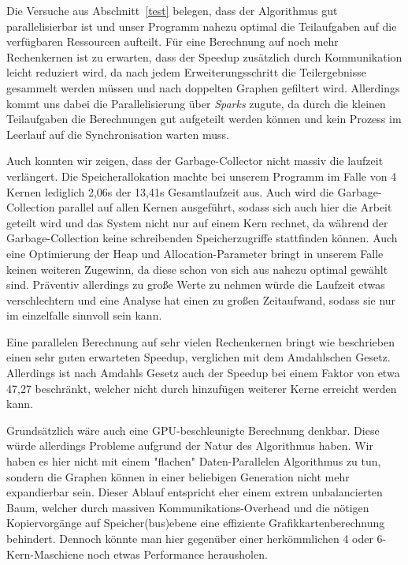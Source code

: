 \documentclass[a4paper]{scrartcl}
\begin{document}
Die Versuche aus Abschnitt~\ref{test} belegen, dass der Algorithmus gut parallelisierbar ist und unser Programm nahezu optimal die Teilaufgaben auf die verfügbaren Ressourcen aufteilt. Für eine Berechnung auf noch mehr Rechenkernen ist zu erwarten, dass der Speedup zusätzlich durch Kommunikation leicht reduziert wird, da nach jedem Erweiterungsschritt die Teilergebnisse gesammelt werden müssen und nach doppelten Graphen gefiltert wird. Allerdings kommt uns dabei die Parallelisierung über \emph{Sparks} zugute, da durch die kleinen Teilaufgaben die Berechnungen gut aufgeteilt werden können und kein Prozess im Leerlauf auf die Synchronisation warten muss. \par
\medskip
Auch konnten wir zeigen, dass der Garbage-Collector nicht massiv die laufzeit verlängert. Die Speicherallokation machte bei unserem Programm im Falle von 4 Kernen lediglich 2,06s der 13,41s Gesamtlaufzeit aus. Auch wird die Garbage-Collection parallel auf allen Kernen ausgeführt, sodass sich auch hier die Arbeit geteilt wird und das System nicht nur auf einem Kern rechnet, da während der Garbage-Collection keine schreibenden Speicherzugriffe stattfinden können.
Auch eine Optimierung der Heap und Allocation-Parameter bringt in unserem Falle keinen weiteren Zugewinn, da diese schon von sich aus nahezu optimal gewählt sind. Präventiv allerdings zu große Werte zu nehmen würde die Laufzeit etwas verschlechtern und eine Analyse hat einen zu großen Zeitaufwand, sodass sie nur im einzelfalle sinnvoll sein kann.\par
\medskip
Eine parallelen Berechnung auf sehr vielen Rechenkernen bringt wie beschrieben einen sehr guten erwarteten Speedup, verglichen mit dem Amdahlschen Gesetz. Allerdings ist nach Amdahls Gesetz auch der Speedup bei einem Faktor von etwa 47,27 beschränkt, welcher nicht durch hinzufügen weiterer Kerne erreicht werden kann.\par
Grundsätzlich wäre auch eine GPU-beschleunigte Berechnung denkbar. Diese würde allerdings Probleme aufgrund der Natur des Algorithmus haben. Wir haben es hier nicht mit einem "flachen" Daten-Parallelen Algorithmus zu tun, sondern die Graphen können in einer beliebigen Generation nicht mehr expandierbar sein. Dieser Ablauf entspricht eher einem extrem unbalancierten Baum, welcher durch massiven Kommunikations-Overhead und die nötigen Kopiervorgänge auf Speicher(bus)ebene eine effiziente Grafikkartenberechnung behindert. Dennoch könnte man hier gegenüber einer herkömmlichen 4 oder 6-Kern-Maschiene noch etwas Performance herausholen.

\end{document}
